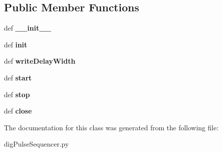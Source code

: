\subsection*{Public Member Functions}
\begin{DoxyCompactItemize}
\item 
\hypertarget{class_chassis_8git_1_1dig_pulse_sequencer_1_1_i_pulse_sequencer_adee016b9c8293a2d824d813ddffa3d0f}{def {\bfseries \-\_\-\-\_\-init\-\_\-\-\_\-}}\label{class_chassis_8git_1_1dig_pulse_sequencer_1_1_i_pulse_sequencer_adee016b9c8293a2d824d813ddffa3d0f}

\item 
\hypertarget{class_chassis_8git_1_1dig_pulse_sequencer_1_1_i_pulse_sequencer_a20ce6f2c2d516dbc519d8c05a206821c}{def {\bfseries init}}\label{class_chassis_8git_1_1dig_pulse_sequencer_1_1_i_pulse_sequencer_a20ce6f2c2d516dbc519d8c05a206821c}

\item 
\hypertarget{class_chassis_8git_1_1dig_pulse_sequencer_1_1_i_pulse_sequencer_a456dbc3088cf042f8000907f92841499}{def {\bfseries write\-Delay\-Width}}\label{class_chassis_8git_1_1dig_pulse_sequencer_1_1_i_pulse_sequencer_a456dbc3088cf042f8000907f92841499}

\item 
\hypertarget{class_chassis_8git_1_1dig_pulse_sequencer_1_1_i_pulse_sequencer_a7ecb2aa2381788aac1beda6dcba423eb}{def {\bfseries start}}\label{class_chassis_8git_1_1dig_pulse_sequencer_1_1_i_pulse_sequencer_a7ecb2aa2381788aac1beda6dcba423eb}

\item 
\hypertarget{class_chassis_8git_1_1dig_pulse_sequencer_1_1_i_pulse_sequencer_a525d560bc2cf4562b7434bbc921e76b3}{def {\bfseries stop}}\label{class_chassis_8git_1_1dig_pulse_sequencer_1_1_i_pulse_sequencer_a525d560bc2cf4562b7434bbc921e76b3}

\item 
\hypertarget{class_chassis_8git_1_1dig_pulse_sequencer_1_1_i_pulse_sequencer_ae62a0c713c27d7b32aefa66072b0d091}{def {\bfseries close}}\label{class_chassis_8git_1_1dig_pulse_sequencer_1_1_i_pulse_sequencer_ae62a0c713c27d7b32aefa66072b0d091}

\end{DoxyCompactItemize}


The documentation for this class was generated from the following file\-:\begin{DoxyCompactItemize}
\item 
dig\-Pulse\-Sequencer.\-py\end{DoxyCompactItemize}
